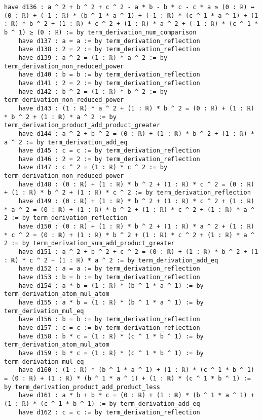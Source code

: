 \documentclass{article}
\begin{document}
\begin{tcolorbox}[colback=white!10, width=\linewidth]
\begin{lstlisting}[language=Lean4]
    have d136 : a ^ 2 + b ^ 2 + c ^ 2 - a * b - b * c - c * a ≥ (0 : ℝ) ↔ (0 : ℝ) + (-1 : ℝ) * (b ^ 1 * a ^ 1) + (-1 : ℝ) * (c ^ 1 * a ^ 1) + (1 : ℝ) * b ^ 2 + (1 : ℝ) * c ^ 2 + (1 : ℝ) * a ^ 2 + (-1 : ℝ) * (c ^ 1 * b ^ 1) ≥ (0 : ℝ) := by term_derivation_num_comparison
    have d137 : a = a := by term_derivation_reflection
    have d138 : 2 = 2 := by term_derivation_reflection
    have d139 : a ^ 2 = (1 : ℝ) * a ^ 2 := by term_derivation_non_reduced_power
    have d140 : b = b := by term_derivation_reflection
    have d141 : 2 = 2 := by term_derivation_reflection
    have d142 : b ^ 2 = (1 : ℝ) * b ^ 2 := by term_derivation_non_reduced_power
    have d143 : (1 : ℝ) * a ^ 2 + (1 : ℝ) * b ^ 2 = (0 : ℝ) + (1 : ℝ) * b ^ 2 + (1 : ℝ) * a ^ 2 := by term_derivation_product_add_product_greater
    have d144 : a ^ 2 + b ^ 2 = (0 : ℝ) + (1 : ℝ) * b ^ 2 + (1 : ℝ) * a ^ 2 := by term_derivation_add_eq
    have d145 : c = c := by term_derivation_reflection
    have d146 : 2 = 2 := by term_derivation_reflection
    have d147 : c ^ 2 = (1 : ℝ) * c ^ 2 := by term_derivation_non_reduced_power
    have d148 : (0 : ℝ) + (1 : ℝ) * b ^ 2 + (1 : ℝ) * c ^ 2 = (0 : ℝ) + (1 : ℝ) * b ^ 2 + (1 : ℝ) * c ^ 2 := by term_derivation_reflection
    have d149 : (0 : ℝ) + (1 : ℝ) * b ^ 2 + (1 : ℝ) * c ^ 2 + (1 : ℝ) * a ^ 2 = (0 : ℝ) + (1 : ℝ) * b ^ 2 + (1 : ℝ) * c ^ 2 + (1 : ℝ) * a ^ 2 := by term_derivation_reflection
    have d150 : (0 : ℝ) + (1 : ℝ) * b ^ 2 + (1 : ℝ) * a ^ 2 + (1 : ℝ) * c ^ 2 = (0 : ℝ) + (1 : ℝ) * b ^ 2 + (1 : ℝ) * c ^ 2 + (1 : ℝ) * a ^ 2 := by term_derivation_sum_add_product_greater
    have d151 : a ^ 2 + b ^ 2 + c ^ 2 = (0 : ℝ) + (1 : ℝ) * b ^ 2 + (1 : ℝ) * c ^ 2 + (1 : ℝ) * a ^ 2 := by term_derivation_add_eq
    have d152 : a = a := by term_derivation_reflection
    have d153 : b = b := by term_derivation_reflection
    have d154 : a * b = (1 : ℝ) * (b ^ 1 * a ^ 1) := by term_derivation_atom_mul_atom
    have d155 : a * b = (1 : ℝ) * (b ^ 1 * a ^ 1) := by term_derivation_mul_eq
    have d156 : b = b := by term_derivation_reflection
    have d157 : c = c := by term_derivation_reflection
    have d158 : b * c = (1 : ℝ) * (c ^ 1 * b ^ 1) := by term_derivation_atom_mul_atom
    have d159 : b * c = (1 : ℝ) * (c ^ 1 * b ^ 1) := by term_derivation_mul_eq
    have d160 : (1 : ℝ) * (b ^ 1 * a ^ 1) + (1 : ℝ) * (c ^ 1 * b ^ 1) = (0 : ℝ) + (1 : ℝ) * (b ^ 1 * a ^ 1) + (1 : ℝ) * (c ^ 1 * b ^ 1) := by term_derivation_product_add_product_less
    have d161 : a * b + b * c = (0 : ℝ) + (1 : ℝ) * (b ^ 1 * a ^ 1) + (1 : ℝ) * (c ^ 1 * b ^ 1) := by term_derivation_add_eq
    have d162 : c = c := by term_derivation_reflection

\end{lstlisting}
\end{tcolorbox}
\end{document}
